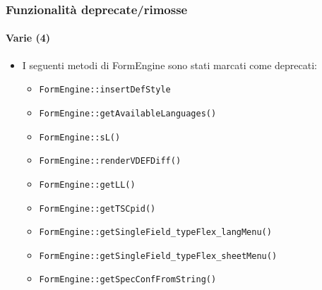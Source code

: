 \begin{frame}[fragile]
	\frametitle{Funzionalità deprecate/rimosse}
	\framesubtitle{Varie (4)}

	\begin{itemize}
		\item I seguenti metodi di FormEngine sono stati marcati come deprecati:
		\begin{itemize}
			\item \texttt{FormEngine::insertDefStyle}
			\item \texttt{FormEngine::getAvailableLanguages()}
			\item \texttt{FormEngine::sL()}
			\item \texttt{FormEngine::renderVDEFDiff()}
			\item \texttt{FormEngine::getLL()}
 			\item \texttt{FormEngine::getTSCpid()}
 			\item \texttt{FormEngine::getSingleField\_typeFlex\_langMenu()}
 			\item \texttt{FormEngine::getSingleField\_typeFlex\_sheetMenu()}
 			\item \texttt{FormEngine::getSpecConfFromString()}
 		\end{itemize}
	\end{itemize}

\end{frame}

